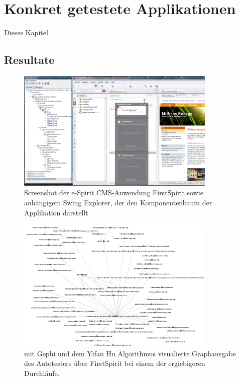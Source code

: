 \chapter{Konkret getestete Applikationen}\label{chapter:concretetests}


Dieses Kapitel


\section{Resultate}\label{section:testresults}

\begin{figure}
	\centering
	\includegraphics[width=0.85\textwidth]{bilder/screenshot_freespirit.png}
	\caption{Screenshot der e-Spirit CMS-Anwendung FirstSpirit \cite{website:firstspirit} 
	sowie anhängigem Swing Explorer, der den Komponentenbaum der Applikation darstellt}
	\label{fig:screenshot_freespirit}
\end{figure}

\begin{figure}
	\centering
	\includegraphics[width=0.85\textwidth]{bilder/model_freespirit.png}
	\caption{mit Gephi \cite{website:gephi} und dem Yifan Hu Algorithmus \cite{hu2005efficient} visualierte Graphausgabe 
	des Autotesters über FirstSpirit bei einem der ergiebigeren Durchläufe.}
	\label{fig:model_freespirit_06.10.2015}
\end{figure}



